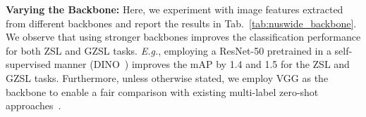 \documentclass[10pt,journal,compsoc]{IEEEtran}
\begin{document}
\begin{table}
\centering
\caption{(G)ZSL performance comparison of our CLF approach with baseline fusion approaches such as average (\texttt{AVG}) and concatenation (\texttt{CONCAT}) on the NUS-WIDE dataset, in terms of F1 and mAP. We observe that our cross-level feature fusion (CLF) approach achieves significant gains over both the baselines on both (G)ZSL tasks. \vspace{0.2em}}
\vspace{-0.2cm}
\label{tab:baseline_fusion_ablation}
\end{table}





\noindent\textbf{Varying the Backbone:} Here, we experiment with image features extracted from different backbones and report the results in Tab.~\ref{tab:nuswide_backbone}. We observe that using stronger backbones improves the classification performance for both ZSL and GZSL tasks. \emph{E.g.}, employing a ResNet-50 pretrained in a self-supervised manner (DINO~\cite{caron2021emerging}) improves the mAP by 1.4 and 1.5 for the ZSL and GZSL tasks. Furthermore, unless otherwise stated, we employ VGG as the backbone to enable a fair comparison with existing multi-label zero-shot approaches~\cite{zhang2016fast,huynh2020shared}.
\end{document}
